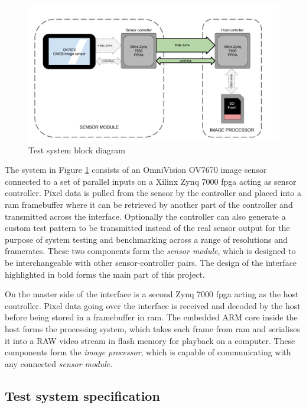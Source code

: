 \documentclass[a4paper]{report}
\begin{document}
\begin{figure}
  \centering
  \includegraphics[width=1\textwidth]{block_diagram_overview.png}
  \caption{Test system block diagram}
  \label{fig:block_diagram_overview}
\end{figure}

The system in Figure \ref{fig:block_diagram_overview} consists of an OmniVision OV7670 image sensor connected to a set of parallel inputs on a Xilinx Zynq 7000 \gls{fpga} acting as sensor controller. Pixel data is pulled from the sensor by the controller and placed into a \gls{ram} framebuffer where it can be retrieved by another part of the controller and transmitted across the interface. Optionally the controller can also generate a custom test pattern to be transmitted instead of the real sensor output for the purpose of system testing and benchmarking across a range of resolutions and framerates. These two components form the \textit{sensor module}, which is designed to be interchangeable with other sensor-controller pairs. The design of the interface highlighted in bold forms the main part of this project. 

On the master side of the interface is a second Zynq 7000 \gls{fpga} acting as the host controller. Pixel data going over the interface is received and decoded by the host before being stored in a framebuffer in \gls{ram}. The embedded ARM core inside the host forms the processing system, which takes each frame from \gls{ram} and serialises it into a RAW video stream in flash memory for playback on a computer. These components form the \textit{image processor}, which is capable of communicating with any connected \textit{sensor module}.

\subsection{Test system specification}
\end{document}
